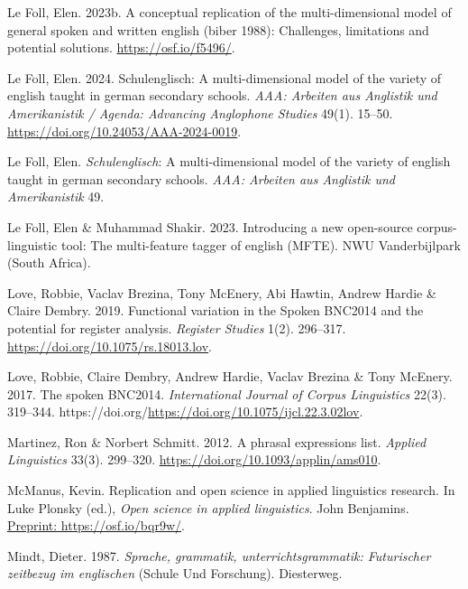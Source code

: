 \documentclass[
  letterpaper,
  DIV=11,
  numbers=noendperiod]{scrreprt}
\newlength{\cslhangindent}
\newenvironment{CSLReferences}[2] %
 {\begin{list}{}{%
  \setlength{\itemindent}{0pt}
  \setlength{\leftmargin}{0pt}
  \setlength{\parsep}{0pt}
  \ifodd #1
   \setlength{\leftmargin}{\cslhangindent}
   \setlength{\itemindent}{-1\cslhangindent}
  \fi
  \setlength{\itemsep}{#2\baselineskip}}}
 {\end{list}}
\begin{document}
\begin{CSLReferences}{1}{0}
Le Foll, Elen. 2023b. A conceptual replication of the multi-dimensional
model of general spoken and written english (biber 1988): Challenges,
limitations and potential solutions. \url{https://osf.io/f5496/}.

Le Foll, Elen. 2024. Schulenglisch: A multi-dimensional model of the
variety of english taught in german secondary schools. \emph{AAA:
Arbeiten aus Anglistik und Amerikanistik / Agenda: Advancing Anglophone
Studies} 49(1). 15--50. \url{https://doi.org/10.24053/AAA-2024-0019}.

Le Foll, Elen. {\emph{Schulenglisch}}: A multi-dimensional model of the
variety of english taught in german secondary schools. \emph{AAA:
Arbeiten aus Anglistik und Amerikanistik} 49.

Le Foll, Elen \& Muhammad Shakir. 2023. Introducing a new open-source
corpus-linguistic tool: The multi-feature tagger of english (MFTE). NWU
Vanderbijlpark (South Africa).

Love, Robbie, Vaclav Brezina, Tony McEnery, Abi Hawtin, Andrew Hardie \&
Claire Dembry. 2019. Functional variation in the Spoken BNC2014 and the
potential for register analysis. \emph{Register Studies} 1(2). 296--317.
\url{https://doi.org/10.1075/rs.18013.lov}.

Love, Robbie, Claire Dembry, Andrew Hardie, Vaclav Brezina \& Tony
McEnery. 2017. The spoken BNC2014. \emph{International Journal of Corpus
Linguistics} 22(3). 319--344.
https://doi.org/\url{https://doi.org/10.1075/ijcl.22.3.02lov}.

Martinez, Ron \& Norbert Schmitt. 2012. A phrasal expressions list.
\emph{Applied Linguistics} 33(3). 299--320.
\url{https://doi.org/10.1093/applin/ams010}.

McManus, Kevin. Replication and open science in applied linguistics
research. In Luke Plonsky (ed.), \emph{Open science in applied
linguistics}. John Benjamins.
\href{Preprint:\%20https://osf.io/bqr9w/}{Preprint:
https://osf.io/bqr9w/}.

Mindt, Dieter. 1987. \emph{Sprache, grammatik, unterrichtsgrammatik:
Futurischer zeitbezug im englischen} (Schule Und Forschung). Diesterweg.


\end{CSLReferences}
\end{document}
